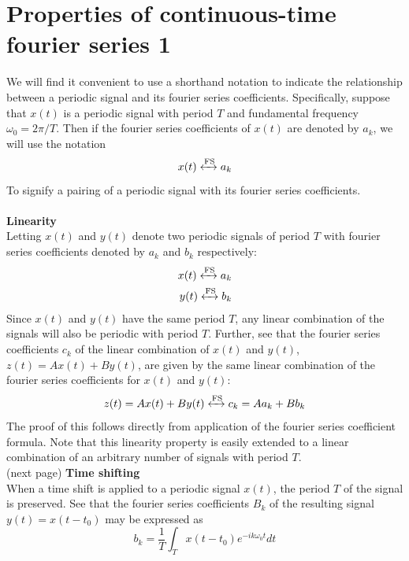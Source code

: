 \documentclass{report}
\begin{document}
\section{Properties of continuous-time fourier series 1}
We will find it convenient to use a shorthand notation to indicate the relationship between a periodic signal and its fourier series coefficients. Specifically,
suppose that $x(t)$ is a periodic signal with period $T$ and fundamental frequency $\omega_0=2\pi/T$. Then if the fourier series coefficients of $x(t)$ are denoted by $a_k$, we will use the notation
\begin{equation*}
x(t)\xleftrightarrow[]{\text{FS}}a_k
\end{equation*}
To signify a pairing of a periodic signal with its fourier series coefficients.\\
\vspace{1mm}\\
\noindent\textbf{Linearity}\\
Letting $x(t)$ and $y(t)$ denote two periodic signals of period $T$ with fourier series coefficients denoted by $a_k$ and $b_k$ respectively:
\begin{align*}
x(t)\xleftrightarrow[]{\text{FS}}a_k\\
y(t)\xleftrightarrow[]{\text{FS}}b_k
\end{align*}
Since $x(t)$ and $y(t)$ have the same period $T$, any linear combination of the signals will also be periodic with period $T$. Further, see that the fourier series coefficients $c_k$ of the linear
combination of $x(t)$ and $y(t)$, $z(t)=Ax(t)+By(t)$, are given by the same linear combination 
of the fourier series coefficients for $x(t)$ and $y(t)$:
\begin{equation*}
z(t)=Ax(t)+By(t)\xleftrightarrow[]{\text{FS}}c_k=Aa_k+Bb_k
\end{equation*}
The proof of this follows directly from application of the fourier series coefficient formula. Note that this linearity property is easily extended to a linear combination of an arbitrary number
of signals with period $T$.\\
(next page)\newpage
\noindent\textbf{Time shifting}\\
When a time shift is applied to a periodic signal $x(t)$, the period $T$ of the signal is preserved. See that the fourier series coefficients $B_k$ of the resulting signal $y(t)=x(t-t_0)$ may be 
expressed as
\begin{equation*}
b_k=\frac{1}{T}\int_Tx(t-t_0)e^{-ik\omega_0t}dt
\end{equation*}
\end{document}
